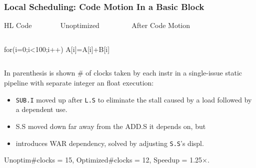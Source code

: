 \documentclass{beamer}
\renewcommand{\emph}[1]{\textcolor{structure}{#1}}
\newcommand{\emp}[1]{\textcolor{DikuRed}{ #1}}
\begin{document}
\begin{frame}[fragile,t]
    \frametitle{Local Scheduling: Code Motion In a Basic Block}

\begin{block}{HL Code{\tt~~~~~~~~}Unoptimized{\tt~~~~~~~~~}After Code Motion}\vspace{-2ex}
\begin{columns}
\begin{colorcode}[fontsize=\scriptsize]
for(i=0;i<100;i++)
  A[i]=A[i]+B[i]
\end{colorcode} 
\end{columns}
\end{block}

In parenthesis is shown \# of clocks taken by each instr
in a single-issue static pipeline with separate integer an float 
execution:\smallskip
\begin{itemize}
    \item {\tt SUB.I} \emp{moved up} after {\tt L.S} to eliminate the stall
            caused by a load followed by a dependent use. 
    \item {S.S} \emp{moved down} far away from the {ADD.S} it depends on, but
    \item introduces {\sc WAR} dependency, solved by adjusting {\tt S.S}'s 
            displ. 
\end  {itemize}

\emph{Unoptim\#clocks = 15, Optimized\#clocks = 12, Speedup = 1.25$\times$.}

\end{frame}
\end{document}
